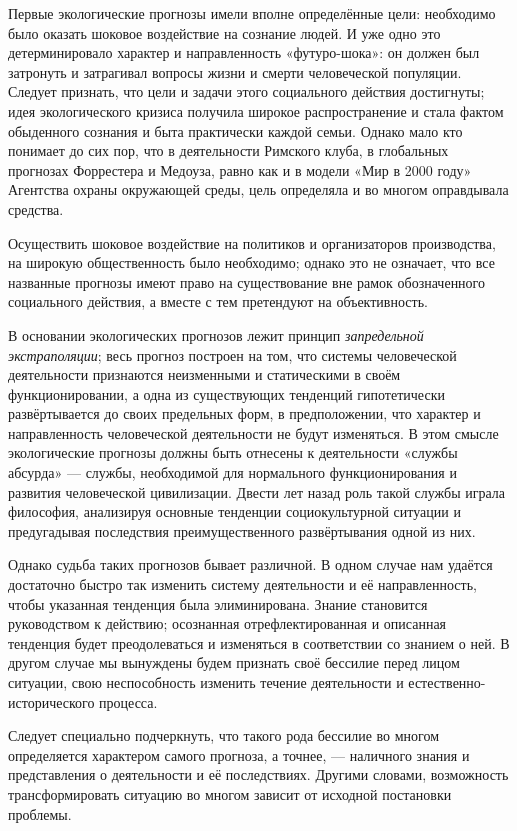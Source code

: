 \documentclass[11pt,a4paper]{article}
\begin{document}
Первые экологические прогнозы имели вполне определённые цели: необходимо было
оказать шоковое воздействие на сознание людей. И уже одно это детерминировало
характер и направленность «футуро-шока»: он должен был затронуть и затрагивал
вопросы жизни и смерти человеческой популяции. Следует признать, что цели и
задачи этого социального действия достигнуты; идея экологического кризиса
получила широкое распространение и стала фактом обыденного сознания и быта
практически каждой семьи. Однако мало кто понимает до сих пор, что в
деятельности Римского клуба, в глобальных прогнозах Форрестера и Медоуза,
равно как и в модели «Мир в 2000 году» Агентства охраны окружающей среды, цель
определяла и во многом оправдывала средства. 

Осуществить шоковое воздействие на политиков и организаторов производства, на
широкую общественность было необходимо; однако это не означает, что все
названные прогнозы имеют право на существование вне рамок обозначенного
социального действия, а вместе с тем претендуют на объективность. 

В основании экологических прогнозов лежит принцип \emph{запредельной
  экстраполяции}; весь прогноз построен на том, что системы человеческой
деятельности признаются неизменными и статическими в своём функционировании, а
одна из существующих тенденций гипотетически развёртывается до своих
предельных форм, в предположении, что характер и направленность человеческой
деятельности не будут изменяться. В этом смысле экологические прогнозы должны
быть отнесены к деятельности «службы абсурда» — службы, необходимой для
нормального функционирования и развития человеческой цивилизации. Двести лет
назад роль такой службы играла философия, анализируя основные тенденции
социокультурной ситуации и предугадывая последствия преимущественного
развёртывания одной из них.

Однако судьба таких прогнозов бывает различной. В одном случае нам удаётся
достаточно быстро так изменить систему деятельности и её направленность, чтобы
указанная тенденция была элиминирована. Знание становится руководством к
действию; осознанная отрефлектированная и описанная тенденция будет
преодолеваться и изменяться в соответствии со знанием о ней. В другом случае
мы вынуждены будем признать своё бессилие перед лицом ситуации, свою
неспособность изменить течение деятельности и естественно-исторического
процесса. 

Следует специально подчеркнуть, что такого рода бессилие во многом
определяется характером самого прогноза, а точнее, — наличного знания и
представления о деятельности и её последствиях. Другими словами, возможность
трансформировать ситуацию во многом зависит от исходной постановки проблемы. 
\end{document}
